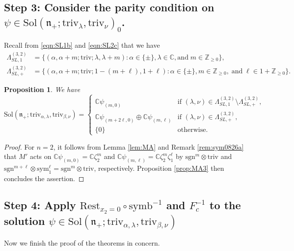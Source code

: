 \documentclass[reqno,11pt]{amsart}
\newtheorem{prop}[equation]{Proposition}
\theoremstyle{remark}
\theoremstyle{definition}
\numberwithin{equation}{section}
\newcommand{\ga}{\alpha}
\newcommand{\gL}{\Lambda}
\newcommand{\fn}{{\mathfrak n}}
\newcommand{\C}{\mathbb{C}}
\newcommand{\Z}{\mathbb{Z}}
\newcommand{\Sol}{\mathrm{Sol}}
\newcommand{\triv}{\mathrm{triv}}
\newcommand{\sym}{\mathrm{sym}}
\newcommand{\symb}{\mathrm{symb}}
\newcommand{\sgn}{\mathrm{sgn}}
\newcommand{\Rest}{\mathrm{Rest}}
\begin{document}
\subsection{Step 3: 
Consider the parity condition on
 $\psi \in \Sol(\fn_+; \triv_{\lambda}, \triv_{\nu})_0$.}
 Recall from \eqref{eqn:SL1b} and \eqref{eqn:SL2c} that
 we have  
 \begin{align*}
\gL^{(3,2)}_{SL,1}&=\{
(\alpha, \alpha+m;\triv;\lambda, \lambda+m)
: \alpha \in \{\pm\}, \lambda \in \C,\text{and} \; m\in \Z_{\geq 0}\},\\
\gL^{(3,2)}_{SL,+}&=\{
(\alpha, \alpha+m; \triv; 1-(m+\ell), 1+\ell) : 
\alpha \in \{\pm\}, m\in \Z_{\geq 0}, \; \text{and} \; \ell\in 1+\Z_{\geq 0}\}.
\end{align*}

 \begin{prop}\label{prop:MA4}
 We have 
 \begin{equation*}
\Sol(\fn_+; \triv_{\ga, \lambda}, \triv_{\beta, \nu})
=
\begin{cases}
\C \psi_{(m,0)} &\text{if $(\lambda,\nu) \in 
\gL^{(3,2)}_{SL,1}\setminus \gL^{(3,2)}_{SL,+}$, }\\
\C\psi_{(m+2\ell, 0)} \oplus \C\psi_{(m,\ell)}
&\text{if $(\lambda,\nu) \in \gL^{(3,2)}_{SL,+}$,}\\
\{0\} &\text{otherwise}.
\end{cases}
 \end{equation*}
 \end{prop}
 
 \begin{proof}
For $n=2$,
it follows from Lemma \ref{lem:MA} and Remark \ref{rem:sym0826a} that
 $M'$ acts on $\C\psi_{(m,0)}=\C\zeta_2^m$ and 
 $\C\psi_{(m,\ell)}=\C \zeta_2^m\zeta_1^\ell$
 by $\sgn^m \otimes \triv$ and 
 $\sgn^{m+\ell}\otimes \sym^\ell_1 = \sgn^m \otimes \triv$, respectively.
Proposition \ref{prop:MA3} then concludes the assertion.
\end{proof}

\subsection{Step 4: 
Apply $\Rest_{x_2=0}\circ \symb^{-1}$ 
and
$F_c^{-1}$ 
to the solution $\psi \in\Sol(\fn_+; \triv_{\alpha, \lambda}, \triv_{\beta, \nu})$
}

Now we finish the proof of the theorems in concern.
\end{document}
